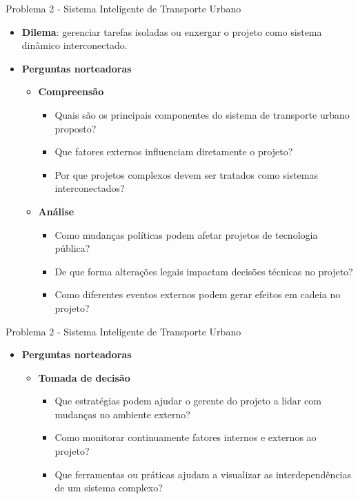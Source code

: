 \documentclass{beamer}
\begin{document}
\begin{frame}{Problema 2 - Sistema Inteligente de Transporte Urbano}
	\begin{itemize}
		\item \textbf{Dilema}: gerenciar tarefas isoladas ou enxergar o projeto como sistema dinâmico interconectado.
		\item \textbf{Perguntas norteadoras}
		\begin{itemize}
			\item \textbf{Compreensão}
				\begin{itemize}
					\justifying
					\item Quais são os principais componentes do sistema de transporte urbano proposto?
					\item Que fatores externos influenciam diretamente o projeto?
					\item Por que projetos complexos devem ser tratados como sistemas interconectados?
				\end{itemize}
			\item \textbf{Análise}
				\begin{itemize}
					\justifying
					\item Como mudanças políticas podem afetar projetos de tecnologia pública?
					\item De que forma alterações legais impactam decisões técnicas no projeto?
					\item Como diferentes eventos externos podem gerar efeitos em cadeia no projeto?
				\end{itemize}
		\end{itemize}
	\end{itemize}
\end{frame}

\begin{frame}{Problema 2 - Sistema Inteligente de Transporte Urbano}
	\begin{itemize}
		\item \textbf{Perguntas norteadoras}
		\begin{itemize}
			\item \textbf{Tomada de decisão}
				\begin{itemize}
					\justifying
					\item Que estratégias podem ajudar o gerente do projeto a lidar com mudanças no ambiente externo?
					\item Como monitorar continuamente fatores internos e externos ao projeto?
					\item Que ferramentas ou práticas ajudam a visualizar as interdependências de um sistema complexo?
				\end{itemize}
		\end{itemize}
	\end{itemize}
\end{frame}
\end{document}
